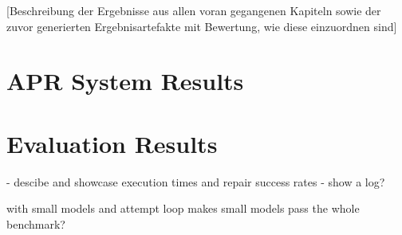 
[Beschreibung der Ergebnisse aus allen voran gegangenen Kapiteln sowie der zuvor generierten Ergebnisartefakte mit Bewertung, wie diese einzuordnen sind]

\section{APR System Results}

\section{Evaluation Results}


- descibe and showcase execution times and repair success rates
- show a log?


with small models and attempt loop makes small models pass the whole benchmark?